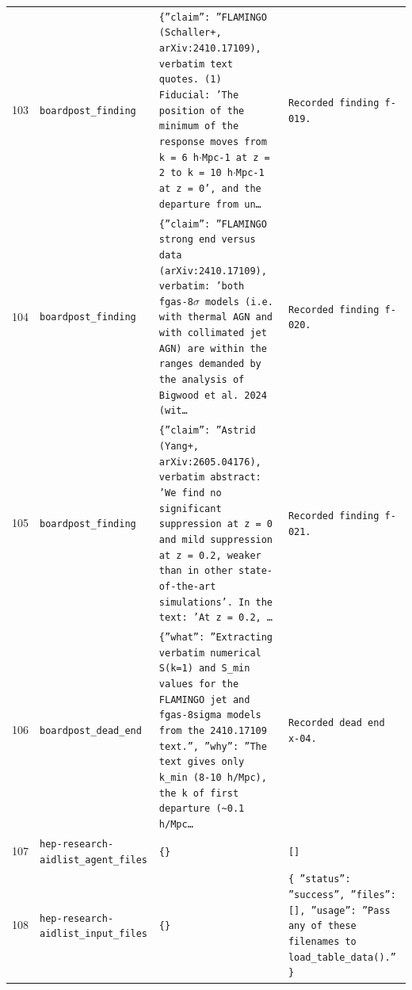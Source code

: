 \documentclass[11pt,a4paper]{article}
\begin{document}
\begin{longtable}{@{}p{}p{}p{}p{}@{}}
103 & \texttt{board}\newline\texttt{post\_\allowbreak{}finding} & \texttt{\{''claim'':\allowbreak{} ''FLAMINGO (Schaller+,\allowbreak{} arXiv:\allowbreak{}2410.17109)\allowbreak{},\allowbreak{} verbatim text quotes. (1)\allowbreak{} Fiducial:\allowbreak{} 'The position of the minimum of the response moves from k =\allowbreak{} 6 h$\cdot$Mpc-1 at z =\allowbreak{} 2 to k =\allowbreak{} 10 h$\cdot$Mpc-1 at z =\allowbreak{} 0',\allowbreak{} and the departure from un\ldots{}\allowbreak{}} & \texttt{Recorded finding f-019.} \\
104 & \texttt{board}\newline\texttt{post\_\allowbreak{}finding} & \texttt{\{''claim'':\allowbreak{} ''FLAMINGO strong end versus data (arXiv:\allowbreak{}2410.17109)\allowbreak{},\allowbreak{} verbatim:\allowbreak{} 'both fgas-8$\sigma$ models (i.e. with thermal AGN and with collimated jet AGN)\allowbreak{} are within the ranges demanded by the analysis of Bigwood et al. 2024 (wit\ldots{}\allowbreak{}} & \texttt{Recorded finding f-020.} \\
105 & \texttt{board}\newline\texttt{post\_\allowbreak{}finding} & \texttt{\{''claim'':\allowbreak{} ''Astrid (Yang+,\allowbreak{} arXiv:\allowbreak{}2605.04176)\allowbreak{},\allowbreak{} verbatim abstract:\allowbreak{} 'We find no significant suppression at z =\allowbreak{} 0 and mild suppression at z =\allowbreak{} 0.2,\allowbreak{} weaker than in other state-of-the-art simulations'. In the text:\allowbreak{} 'At z =\allowbreak{} 0.2,\allowbreak{} \ldots{}\allowbreak{}} & \texttt{Recorded finding f-021.} \\
106 & \texttt{board}\newline\texttt{post\_\allowbreak{}dead\_\allowbreak{}end} & \texttt{\{''what'':\allowbreak{} ''Extracting verbatim numerical S(k=\allowbreak{}1)\allowbreak{} and S\_\allowbreak{}min values for the FLAMINGO jet and fgas-8sigma models from the 2410.17109 text.'',\allowbreak{} ''why'':\allowbreak{} ''The text gives only k\_\allowbreak{}min (8-10 h/\allowbreak{}Mpc)\allowbreak{},\allowbreak{} the k of first departure (\textasciitilde{}\allowbreak{}0.1 h/\allowbreak{}Mpc\ldots{}\allowbreak{}} & \texttt{Recorded dead end x-04.} \\
107 & \texttt{hep-research-aid}\newline\texttt{list\_\allowbreak{}agent\_\allowbreak{}files} & \texttt{\{\}\allowbreak{}} & \texttt{[]\allowbreak{}} \\
108 & \texttt{hep-research-aid}\newline\texttt{list\_\allowbreak{}input\_\allowbreak{}files} & \texttt{\{\}\allowbreak{}} & \texttt{\{   ''status'':\allowbreak{} ''success'',\allowbreak{}   ''files'':\allowbreak{} []\allowbreak{},\allowbreak{}   ''usage'':\allowbreak{} ''Pass any of these filenames to load\_\allowbreak{}table\_\allowbreak{}data()\allowbreak{}.'' \}\allowbreak{}} \\

\end{longtable}
\end{document}
